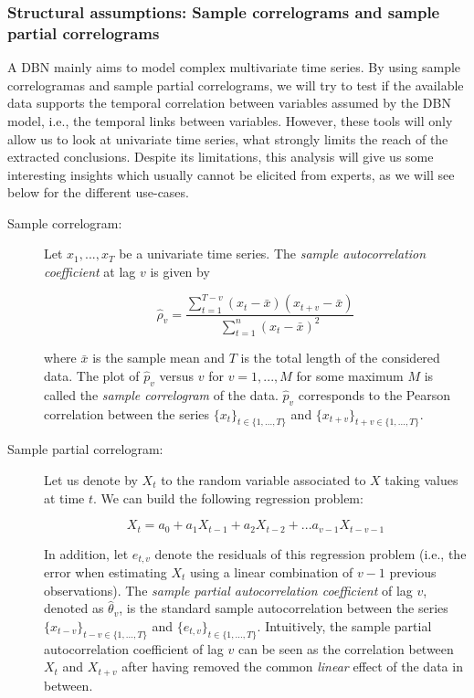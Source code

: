 \subsubsection{Structural assumptions: Sample correlograms and sample partial correlograms}

A DBN mainly aims to model complex multivariate time series. By using sample correlogramas and sample partial correlograms, we will try to test if the available data supports the temporal correlation between variables assumed by the DBN model, i.e., the temporal links between variables. However, these tools will only allow us to look at univariate time series, what strongly limits the reach of the  extracted conclusions. Despite its limitations, this analysis will give us some interesting insights which usually cannot be elicited from experts, as we will see below for the different use-cases.  

\begin{description}
\item[Sample correlogram:] Let ${x_1,...,x_T}$ be a univariate time series. The \emph{sample autocorrelation coefficient} at lag $v$ is given by 

$$ \hat{\rho}_v =\frac{\sum_{t=1}^{T-v} (x_t-\bar{x})(x_{t+v}-\bar{x})}{\sum_{t=1}^{n} (x_t-\bar{x})^2}$$ 

\noindent where $\bar{x}$ is the sample mean and $T$ is the total length of the considered data. The plot of $\hat{p}_v$ versus $v$ for $v=1,..., M$ for some maximum $M$ is called the \emph{sample correlogram} of the data. $\hat{p}_v$ corresponds to the Pearson correlation between the series $\{x_t\}_{t\in\{1,...,T\}}$ and $\{x_{t+v}\}_{t+v\in\{1,...,T\}}$.

\item[Sample partial correlogram:] Let us denote by $X_t$ to the random variable associated to $X$ taking values at time $t$. We can build the following regression problem:

$$ X_t = a_0 + a_1X_{t-1} + a_2X_{t-2} + ... a_{v-1}X_{t-v-1}$$

In addition, let $e_{t,v}$ denote the residuals of this regression problem (i.e., the error when estimating $X_t$ using a linear combination of $v-1$ previous observations). The \emph{sample partial autocorrelation coefficient} of lag $v$, denoted as  $\hat{\theta}_v$, is the standard sample autocorrelation between the series $\{x_{t-v}\}_{t-v\in\{1,...,T\}}$ and $\{e_{t,v}\}_{t\in\{1,...,T\}}$. Intuitively, the sample partial autocorrelation coefficient of lag $v$ can be seen as the correlation between $X_t$ and $X_{t+v}$ after having removed the common \emph{linear} effect of the data in between.
\end{description}

